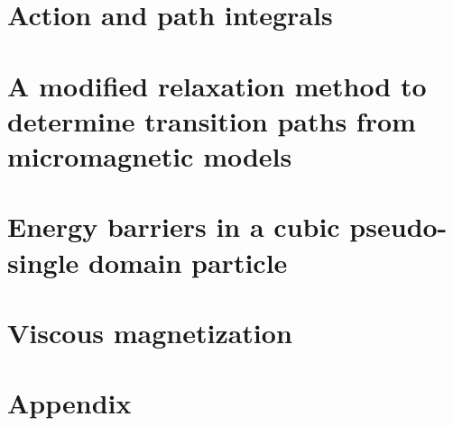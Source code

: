 \documentclass[a4paper]{article}
\begin{document}
 \section{Action and path integrals}

\section{A modified relaxation method to determine transition paths from micromagnetic models}

\section{Energy barriers in a cubic pseudo-single domain particle}


\section{Viscous magnetization}

\section{Appendix}




\end{document}
